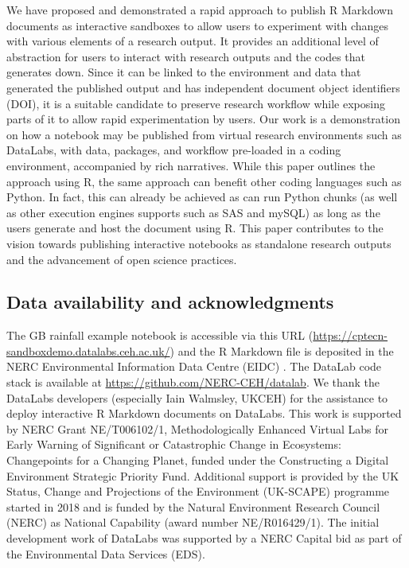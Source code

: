 We have proposed and demonstrated a rapid approach to publish R Markdown
documents as interactive sandboxes to allow users to experiment with
changes with various elements of a research output. It provides an
additional level of abstraction for users to interact with research
outputs and the codes that generates down. Since it can be linked to the
environment and data that generated the published output and has
independent document object identifiers (DOI), it is a suitable
candidate to preserve research workflow while exposing parts of it to
allow rapid experimentation by users. Our work is a demonstration on how
a notebook may be published from virtual research environments such as
DataLabs, with data, packages, and workflow pre-loaded in a coding
environment, accompanied by rich narratives. While this paper outlines
the approach using R, the same approach can benefit other coding
languages such as Python. In fact, this can already be achieved as
 can run Python chunks (as well as other execution
engines  supports such as SAS and mySQL) as long as the
users generate and host the document using R. This paper contributes to
the vision towards publishing interactive notebooks as standalone
research outputs and the advancement of open science practices.

\hypertarget{data-availability-and-acknowledgments}{%
\subsection{Data availability and
acknowledgments}\label{data-availability-and-acknowledgments}}

The GB rainfall example notebook is accessible via this URL
(\url{https://cptecn-sandboxdemo.datalabs.ceh.ac.uk/}) and the R
Markdown file is deposited in the NERC Environmental Information Data
Centre (EIDC) \citep{EIDC}. The DataLab code stack is available at
\url{https://github.com/NERC-CEH/datalab}. We thank the DataLabs
developers (especially Iain Walmsley, UKCEH) for the assistance to
deploy interactive R Markdown documents on DataLabs. This work is
supported by NERC Grant NE/T006102/1, Methodologically Enhanced Virtual
Labs for Early Warning of Significant or Catastrophic Change in
Ecosystems: Changepoints for a Changing Planet, funded under the
Constructing a Digital Environment Strategic Priority Fund. Additional
support is provided by the UK Status, Change and Projections of the
Environment (UK-SCAPE) programme started in 2018 and is funded by the
Natural Environment Research Council (NERC) as National Capability
(award number NE/R016429/1). The initial development work of DataLabs
was supported by a NERC Capital bid as part of the Environmental Data
Services (EDS).

